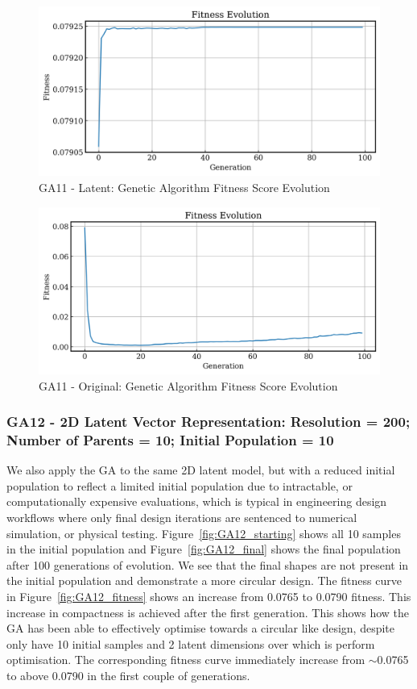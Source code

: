 \documentclass{article}
\begin{document}
\begin{figure}[H]
    \centering
    \includegraphics[width=0.75\linewidth]{figures/GAResults/GA11/latent/100gen_fitness.png}
    \caption{GA11 - Latent: Genetic Algorithm Fitness Score Evolution}
    \label{fig:GA11_latent_fitness}
\end{figure}

\begin{figure}[H]
    \centering
    \includegraphics[width=0.75\linewidth]{figures/GAResults/GA11/original/original_200n_fitness.png}
    \caption{GA11 - Original: Genetic Algorithm Fitness Score Evolution}
    \label{fig:GA11_original_fitness}
\end{figure}

\subsubsection*{GA12 - 2D Latent Vector Representation: Resolution = 200; Number of Parents = 10; Initial Population = 10}

We also apply the GA to the same 2D latent model, but with a reduced initial population to reflect a limited initial population due to intractable, or computationally expensive evaluations, which is typical in engineering design workflows where only final design iterations are sentenced to numerical simulation, or physical testing. 
Figure~\ref{fig:GA12_starting} shows all 10 samples in the initial population and Figure~\ref{fig:GA12_final} shows the final population after 100 generations of evolution. We see that the final shapes are not present in the initial population and demonstrate a more circular design. The fitness curve in Figure~\ref{fig:GA12_fitness} shows an increase from 0.0765 to 0.0790 fitness. This increase in compactness is achieved after the first generation. This shows how the GA has been able to effectively optimise towards a circular like design, despite only have 10 initial samples and 2 latent dimensions over which is perform optimisation. The corresponding fitness curve immediately increase from $\sim$0.0765 to above 0.0790 in the first couple of generations.
\end{document}
